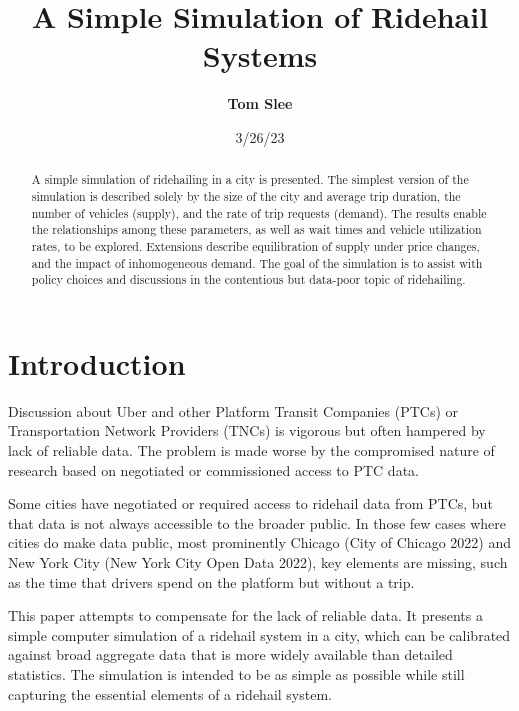 \documentclass[
  letterpaper,
]{article}
\title{A Simple Simulation of Ridehail Systems}
\author{
\textbf{Tom Slee}\\}
\date{3/26/23}
\renewcommand*\contentsname{Table of contents}
\newcommand\contentsname{Table of contents}
\begin{document}
\maketitle
\begin{abstract}
A simple simulation of ridehailing in a city is presented. The simplest
version of the simulation is described solely by the size of the city
and average trip duration, the number of vehicles (supply), and the rate
of trip requests (demand). The results enable the relationships among
these parameters, as well as wait times and vehicle utilization rates,
to be explored. Extensions describe equilibration of supply under price
changes, and the impact of inhomogeneous demand. The goal of the
simulation is to assist with policy choices and discussions in the
contentious but data-poor topic of ridehailing.
\end{abstract}
\ifdefined\Shaded\renewenvironment{Shaded}{\begin{tcolorbox}[boxrule=0pt, borderline west={3pt}{0pt}{shadecolor}, breakable, enhanced, frame hidden, interior hidden, sharp corners]}{\end{tcolorbox}}\fi

\renewcommand*\contentsname{Contents}
{
\hypersetup{linkcolor=}
\setcounter{tocdepth}{3}
\tableofcontents
}
\hypertarget{introduction}{%
\section{Introduction}\label{introduction}}

Discussion about Uber and other Platform Transit Companies (PTCs) or
Transportation Network Providers (TNCs) is vigorous but often hampered
by lack of reliable data. The problem is made worse by the compromised
nature of research based on negotiated or commissioned access to PTC
data.

Some cities have negotiated or required access to ridehail data from
PTCs, but that data is not always accessible to the broader public. In
those few cases where cities do make data public, most prominently
Chicago (City of Chicago 2022) and New York City (New York City Open
Data 2022), key elements are missing, such as the time that drivers
spend on the platform but without a trip.

This paper attempts to compensate for the lack of reliable data. It
presents a simple computer simulation of a ridehail system in a city,
which can be calibrated against broad aggregate data that is more widely
available than detailed statistics. The simulation is intended to be as
simple as possible while still capturing the essential elements of a
ridehail system.
\end{document}
